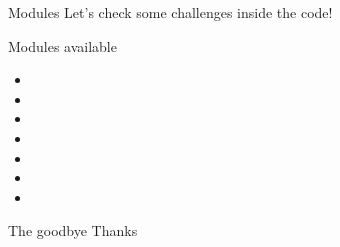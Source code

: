 \documentclass[newPxFont]{beamer}
\begin{document}
\begin{frame}[c]{Modules}
Let's check some challenges inside the code!
\begin{block}{Modules available}
\begin{itemize}
\item {}
\item {}
\item {}
\item {}
\item {}
\item {}
\item {}
\end{itemize}
\end{block}
\end{frame}


\begin{frame}{The goodbye}
Thanks
\end{frame}


\end{document}
